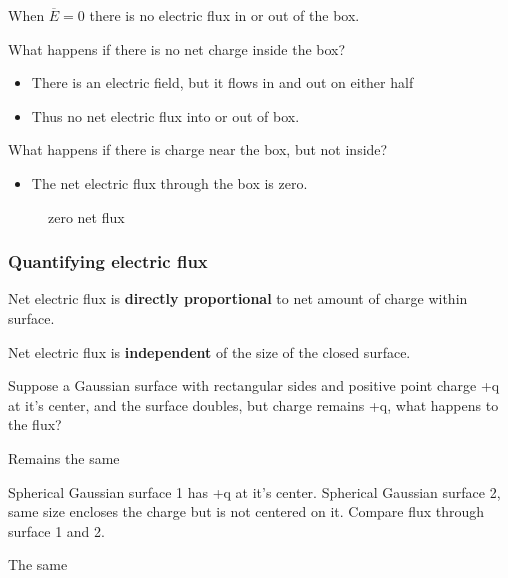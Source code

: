 When $\overline{E} = 0$ there is no electric flux in or out of the box.

What happens if there is no net charge inside the box?
\begin{itemize}
	\item There is an electric field, but it flows in and out on either half
	\item Thus no net electric flux into or out of box.
\end{itemize}

What happens if there is charge near the box, but not inside?

\begin{itemize}
	\item The net electric flux through the box is zero.
	\end{itemize}\begin{figure}[ht]
	\centering
	\caption{zero net flux}
	\label{fig:zero-net-flux}
\end{figure}

\subsubsection{Quantifying electric flux}%
\label{ssub:quantifying_electric_flux}

Net electric flux is \textbf{directly proportional} to net amount of charge within surface.

Net electric flux is \textbf{independent} of the size of the closed surface.

\begin{example}[]
	Suppose a Gaussian surface with rectangular sides and positive point charge +q at it's center,
	and the surface doubles, but charge remains +q, what happens to the flux?
\end{example}

\begin{solution}[]
	Remains the same
\end{solution}

\begin{example}[]
	Spherical Gaussian surface 1 has +q at it's center. Spherical Gaussian surface 2, same size encloses
	the charge but is not centered on it. Compare flux through surface 1 and 2.
\end{example}

\begin{solution}[]
	The same
\end{solution}

